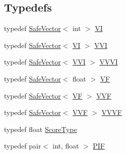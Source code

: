 \subsection*{Typedefs}
\begin{DoxyCompactItemize}
\item 
typedef \hyperlink{class_p_r_o_b_c_o_n_s_1_1_safe_vector}{Safe\+Vector}$<$ int $>$ \hyperlink{namespace_p_r_o_b_c_o_n_s_af5836390f1b6599e5a0337a7dcd4b5d7}{V\+I}
\item 
typedef \hyperlink{class_p_r_o_b_c_o_n_s_1_1_safe_vector}{Safe\+Vector}$<$ \hyperlink{namespace_p_r_o_b_c_o_n_s_af5836390f1b6599e5a0337a7dcd4b5d7}{V\+I} $>$ \hyperlink{namespace_p_r_o_b_c_o_n_s_a641706f2197f8a5569b46b7ab218a477}{V\+V\+I}
\item 
typedef \hyperlink{class_p_r_o_b_c_o_n_s_1_1_safe_vector}{Safe\+Vector}$<$ \hyperlink{namespace_p_r_o_b_c_o_n_s_a641706f2197f8a5569b46b7ab218a477}{V\+V\+I} $>$ \hyperlink{namespace_p_r_o_b_c_o_n_s_a503407de78ebd65ad6c605841c125622}{V\+V\+V\+I}
\item 
typedef \hyperlink{class_p_r_o_b_c_o_n_s_1_1_safe_vector}{Safe\+Vector}$<$ float $>$ \hyperlink{namespace_p_r_o_b_c_o_n_s_a7d46b91dfef3fa4038545a492ad12221}{V\+F}
\item 
typedef \hyperlink{class_p_r_o_b_c_o_n_s_1_1_safe_vector}{Safe\+Vector}$<$ \hyperlink{namespace_p_r_o_b_c_o_n_s_a7d46b91dfef3fa4038545a492ad12221}{V\+F} $>$ \hyperlink{namespace_p_r_o_b_c_o_n_s_a64c77882f700f0f6e9426241c7d7ba1c}{V\+V\+F}
\item 
typedef \hyperlink{class_p_r_o_b_c_o_n_s_1_1_safe_vector}{Safe\+Vector}$<$ \hyperlink{namespace_p_r_o_b_c_o_n_s_a64c77882f700f0f6e9426241c7d7ba1c}{V\+V\+F} $>$ \hyperlink{namespace_p_r_o_b_c_o_n_s_a52a210cf4dfe0ea3c7d83898230cfeaf}{V\+V\+V\+F}
\item 
typedef float \hyperlink{namespace_p_r_o_b_c_o_n_s_a93b8c2a0a0de0dd3d36b847946ed288c}{Score\+Type}
\item 
typedef pair$<$ int, float $>$ \hyperlink{namespace_p_r_o_b_c_o_n_s_a397767dfc075ae6ba7e480f5f06edc32}{P\+I\+F}
\end{DoxyCompactItemize}

